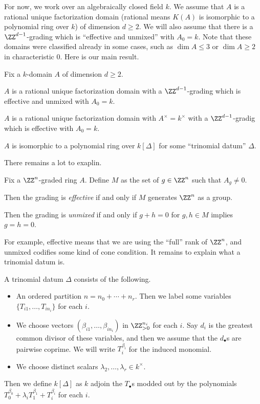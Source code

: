 \documentclass{article}
\begin{document}
For now, we work over an algebraically closed field $k$. We assume that $A$ is a rational unique factorization domain (rational means $K(A)$ is isomorphic to a polynomial ring over $k$) of dimension $d\ge2$. We will also assume that there is a $\ZZ^{d-1}$-grading which is ``effective and unmixed'' with $A_0=k$. Note that these domains were classified already in some cases, such as $\dim A\le3$ or $\dim A\ge2$ in characteristic $0$. Here is our main result.
\begin{theorem}
	Fix a $k$-domain $A$ of dimension $d\ge2$.
	\begin{listroman}
		\item $A$ is a rational unique factorization domain with a $\ZZ^{d-1}$-grading which is effective and unmixed with $A_0=k$.
		\item $A$ is a rational unique factorization domain with $A^\times=k^\times$ with a $\ZZ^{d-1}$-gradig which is effective with $A_0=k$.
		\item $A$ is isomorphic to a polynomial ring over $k[\Delta]$ for some ``trinomial datum'' $\Delta$.
	\end{listroman}
\end{theorem}
There remains a lot to exaplin.
\begin{definition}
	Fix a $\ZZ^n$-graded ring $A$. Define $M$ as the set of $g\in\ZZ^n$ such that $A_g\ne0$.
	\begin{listalph}
		\item Then the grading is \textit{effective} if and only if $M$ generates $\ZZ^n$ as a group.
		\item Then the grading is \textit{unmixed} if and only if $g+h=0$ for $g,h\in M$ implies $g=h=0$.
	\end{listalph}
\end{definition}
For example, effective means that we are using the ``full'' rank of $\ZZ^n$, and unmixed codifies some kind of cone condition. It remains to explain what a trinomial datum is.
\begin{definition}
	A trinomial datum $\Delta$ consists of the following.
	\begin{itemize}
		\item An ordered partition $n=n_0+\cdots+n_r$. Then we label some variables $\{T_{i1},\ldots,T_{in_i}\}$ for each $i$.
		\item We choose vectors $(\beta_{i1},\ldots,\beta_{in_i})$ in $\ZZ_{>0}^{n_i}$ for each $i$. Say $d_i$ is the greatest common divisor of these variables, and then we assume that the $d_\bullet$s are pairwise coprime. We will write $T_i^{\beta_i}$ for the induced monomial.
		\item We choose distinct scalars $\lambda_2,\ldots,\lambda_r\in k^\times$.
	\end{itemize}
	Then we define $k[\Delta]$ as $k$ adjoin the $T_\bullet$s modded out by the polynomials $T_0^{\beta_0}+\lambda_iT_1^{\beta_1}+T_i^{\beta_i}$ for each $i$.
\end{definition}
\end{document}
